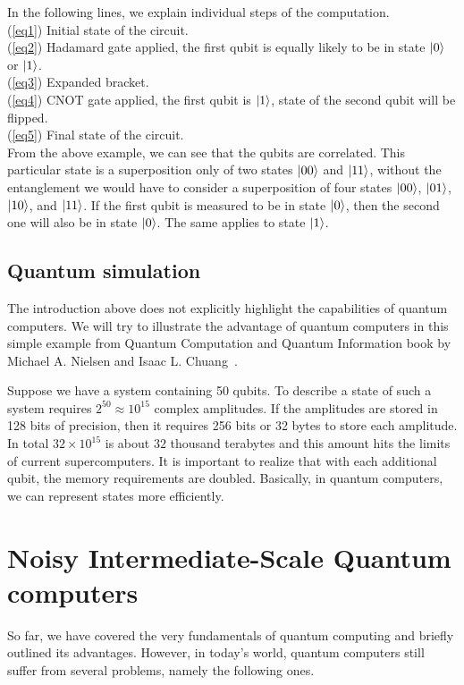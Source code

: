 \noindent In the following lines, we explain individual steps of the computation.\\
\noindent (\ref{eq1}) Initial state of the circuit.\\
(\ref{eq2}) Hadamard gate applied, the first qubit is equally likely to be in state $\lvert0\rangle$ or $\lvert1\rangle$.\\
(\ref{eq3}) Expanded bracket.\\
(\ref{eq4}) CNOT gate applied, the first qubit is $\lvert1\rangle$, state of the second qubit will be flipped.\\
(\ref{eq5}) Final state of the circuit.\\

\noindent From the above example, we can see that the qubits are correlated. This particular state is a superposition only of two states $\lvert00\rangle$ and $\lvert11\rangle$, without the entanglement we would have to consider a superposition of four states $\lvert00\rangle$, $\lvert01\rangle$, $\lvert10\rangle$, and $\lvert11\rangle$. If the first qubit is measured to be in state $\lvert0\rangle$, then the second one will also be in state $\lvert0\rangle$. The same applies to state $\lvert1\rangle$.

\tocless\subsection{Quantum simulation}\noindent
The introduction above does not explicitly highlight the capabilities of quantum computers. We will try to illustrate the advantage of quantum computers in this simple example from Quantum Computation and Quantum Information book by Michael A. Nielsen and Isaac L. Chuang~\cite{qc}.

Suppose we have a system containing 50 qubits. To describe a state of such a system requires $2^{50} \approx 10^{15}$ complex amplitudes. If the amplitudes are stored in 128 bits of precision, then it requires 256 bits or 32 bytes to store each amplitude. In total $32 \times 10^{15}$ is about $32$ thousand terabytes and this amount hits the limits of current supercomputers. It is important to realize that with each additional qubit, the memory requirements are doubled. Basically, in quantum computers, we can represent states more efficiently.

\section{Noisy Intermediate-Scale Quantum computers}
So far, we have covered the very fundamentals of quantum computing and briefly outlined its advantages. However, in today's world, quantum computers still suffer from several problems, namely the following ones.

